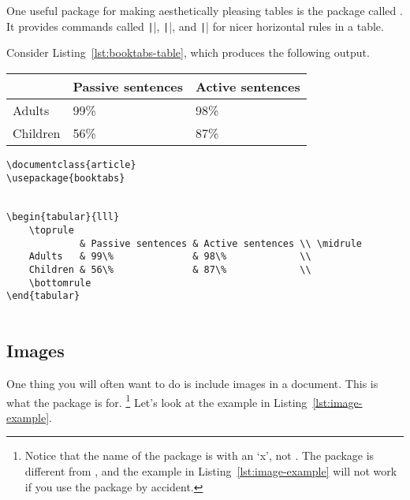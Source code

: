 One useful package for making aesthetically pleasing tables is the package called .
It provides commands called \texttt|\toprule|, \texttt|\bottomrule|, and \texttt|\midrule| for nicer horizontal rules in a table.

\begin{minipage}{\textwidth}

Consider Listing~\ref{lst:booktabs-table}, which produces the following output.

\begin{center}
	\begin{tabular}{lll}
		\toprule
		         & Passive sentences & Active sentences \\ \midrule
		Adults   & 99\%              & 98\%             \\
		Children & 56\%              & 87\%             \\
		\bottomrule
	\end{tabular}
\end{center}

\end{minipage}

\begin{listing}[htbp]
	\centering
	\begin{verbatim}
\documentclass{article}
\usepackage{booktabs}


\begin{tabular}{lll}
    \toprule
             & Passive sentences & Active sentences \\ \midrule
    Adults   & 99\%              & 98\%             \\
    Children & 56\%              & 87\%             \\
    \bottomrule
\end{tabular}


	\end{verbatim}
	\caption{A table in \LaTeX{} using the package }
	\label{lst:booktabs-table}
\end{listing}

\subsection{Images}
\label{subsec:images}

One thing you will often want to do is include images in a document.
This is what the package  is for.%
\footnote{%
Notice that the name of the package is  with an `x', not .
The  package is different from , and the example in Listing~\ref{lst:image-example} will not work if you use the  package by accident.%
}
Let's look at the example in Listing~\ref{lst:image-example}.

